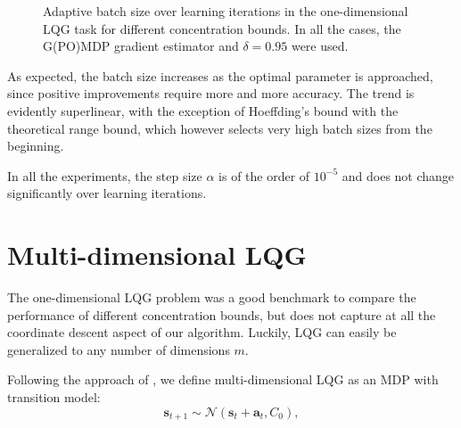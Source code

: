{\begin{figure}[t!]
\begin{adjustbox}{center}
{	\label{fig:6}
	}
\end{adjustbox}

\caption[Adaptive batch size over learning iterations in the one-dimensional LQG task for different concentration bounds.]{Adaptive batch size over learning iterations in the one-dimensional \ac{LQG} task for different concentration bounds. In all the cases, the G(PO)MDP gradient estimator and $\delta=0.95$ were used.}
\label{fig:8}
\end{figure}
\clearpage
}

As expected, the batch size increases as the optimal parameter is approached, since positive improvements require more and more accuracy. The trend is evidently superlinear, with the exception of Hoeffding's bound with the theoretical range bound, which however selects very high batch sizes from the beginning. 

In all the experiments, the step size $\alpha$ is of the order of $10^{-5}$ and does not change significantly over learning iterations.


\section{Multi-dimensional LQG}\label{sec:lqg2d}
The one-dimensional \ac{LQG} problem was a good benchmark to compare the performance of different concentration bounds, but does not capture at all the coordinate descent aspect of our algorithm. Luckily, \ac{LQG} can easily be generalized to any number of dimensions $m$.

Following the approach of \cite{Pirotta:2015:MRL:2888116.2888124}, we define multi-dimensional \ac{LQG} as an \ac{MDP} with transition model:
\[
	\boldsymbol{s}_{t+1} \sim \mathcal{N}(\boldsymbol{s}_t+\boldsymbol{a}_t,C_0),
\] 

